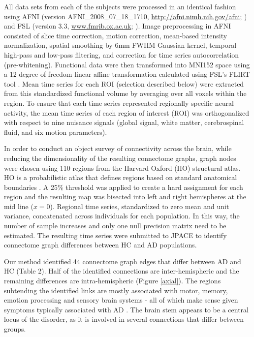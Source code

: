 \documentclass[useAMS,usenatbib,referee]{bio}
\begin{document}
{All data sets from each of the subjects were processed in an identical fashion using AFNI (version AFNI\_2008\_07\_18\_1710, \url{http://afni.nimh.nih.gov/afni}; \citealp{Cox1996}) and FSL (version 3.3, \url{www.fmrib.ox.ac.uk}; \citealp{Smith2012}). Image preprocessing in AFNI consisted of slice time correction, motion correction, mean-based intensity normalization, spatial smoothing by 6mm FWHM Gaussian kernel, temporal high-pass and low-pass filtering, and correction for time series autocorrelation (pre-whitening). Functional data were then transformed into MNI152 space using a 12 degree of freedom linear affine transformation calculated using FSL's FLIRT tool \citep{flirt}. Mean time series for each ROI (selection described below) were extracted from this standardized functional volume by averaging over all voxels within the region. To ensure that each time series represented regionally specific neural activity, the mean time series of each region of interest (ROI) was orthogonalized with respect to nine nuisance signals (global signal, white matter, cerebrospinal fluid, and six motion parameters). 

In order to conduct an object survey of connectivity across the brain, while reducing the dimensionality of the resulting connectome graphs, graph nodes were chosen using 110 regions from the Harvard-Oxford (HO) structural atlas. HO is a probabilistic atlas that defines regions based on standard anatomical boundaries \citep{Kennedy, Makris}. A 25\%  threshold was applied to create a hard assignment for each region and the resulting map was bisected into left and right hemispheres at the mid line ($x=0$). Regional time series, standardized to zero mean and unit variance, concatenated across individuals for each population. In this way, the number of sample increases and only one null precision matrix need to be estimated. The resulting time series were submitted to JPACE to identify connectome graph differences between HC and AD populations.

Our method identified 44 connectome graph edges that differ between AD and HC (Table 2). Half of the identified connections are inter-hemispheric and the remaining differences are intra-hemispheric (Figure \ref{axial}). The regions subtending the identified links are mostly associated with motor, memory, emotion processing and sensory brain systems - all of which make sense given symptoms typically associated with AD \citep{ADimage}. The brain stem appears to be a central locus of the disorder, as it is involved in several connections that differ between groups. 

}
\end{document}
